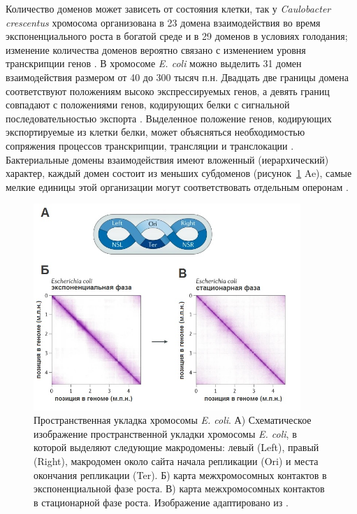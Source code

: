 Количество доменов может зависеть от состояния клетки, так у \textit{Caulobacter crescentus} хромосома организована в 23 домена взаимодействия во время экспоненциального роста в богатой среде и в 29 доменов в условиях голодания; изменение количества доменов вероятно связано с изменением уровня транскрипции генов \cite{dame2020chromosome}. В хромосоме \textit{E. coli} можно выделить 31 домен взаимодействия размером от 40 до 300 тысяч п.н. Двадцать две границы домена соответствуют положениям высоко экспрессируемых генов, а девять границ совпадают с положениями генов, кодирующих белки с сигнальной последовательностью экспорта \cite{lioy2018multiscale}. Выделенное положение генов, кодирующих экспортируемые из клетки белки, может объясняться необходимостью сопряжения процессов транскрипции, трансляции и транслокации \cite{woldringh2002role}. Бактериальные домены взаимодействия имеют вложенный (иерархический) характер, каждый домен состоит из меньших субдоменов (рисунок~\ref{img:coli_3d} Ae), самые мелкие единицы этой организации могут соответствовать отдельным оперонам \cite{dame2020chromosome}.

\begin{figure}[!ht] 
  \center
  \includegraphics [width=0.9\textwidth] {Dissertation/images/lit/coli_3d.jpg}
  \caption{Пространственная укладка хромосомы \textit{E. coli}. А) Схематическое изображение пространственной укладки хромосомы \textit{E. coli}, в которой выделяют следующие макродомены: левый (Left), правый (Right), макродомен около сайта начала репликации (Ori) и места окончания репликации (Ter). Б) карта межхромосомных контактов в экспоненциальной фазе роста. В) карта межхромосомных контактов в стационарной фазе роста. Изображение адаптировано из \cite{dame2020chromosome}.} 
  \label{img:coli_3d}  
\end{figure}


